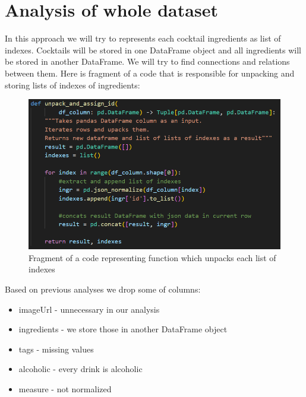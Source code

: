 \documentclass[a4paper]{article}
\begin{document}
\section{Analysis of whole dataset}
In this approach we will try to represents each cocktail ingredients as list of indexes. Cocktails will be stored in one DataFrame object and all ingredients will be stored in another DataFrame. We will try to find connections and relations between them. Here is fragment of a code that is responsible for unpacking and storing lists of indexes of ingredients:
\begin{figure}[H]
    \centering
    \includegraphics[width=0.9\linewidth]{code_unpacking.png}
    \caption{Fragment of a code representing function which unpacks each list of indexes}
    \label{fig:enter-label}
\end{figure}
Based on previous analyses we drop some of columns:
\begin{itemize}
    \item imageUrl - unnecessary in our analysis
    \item ingredients - we store those in another DataFrame object
    \item tags - missing values
    \item alcoholic - every drink is alcoholic
    \item measure - not normalized
\end{itemize}
\end{document}
